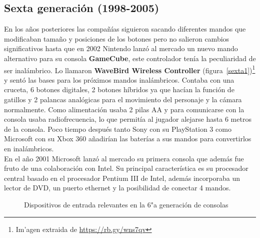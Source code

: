 
\subsection{Sexta generaci\'on (1998-2005)}

En los a\~nos posteriores las compa\~n\'ias siguieron sacando diferentes mandos que modificaban tama\~no y posiciones de los botones pero no salieron cambios significativos hasta que en 2002 Nintendo lanz\'o al mercado un nuevo mando alternativo para su consola \textbf{GameCube}, este controlador ten\'ia la peculiaridad de ser inal\'ambrico. Lo llamaron \textbf{WaveBird Wireless Controller} (figura~\ref{sexta1})\footnote{Im'agen extraida de \url{https://rb.gy/wns7qv}} y sent\'o las bases para los pr\'oximos mandos inal\'ambricos. Contaba con una cruceta, 6 botones digitales, 2 botones h\'ibridos ya que hac\'ian la funci\'on de gatillos y 2 palancas anal\'ogicas para el movimiento del personaje y la c\'amara normalmente. Como alimentaci\'on usaba 2 pilas AA y para comunicarse con la consola usaba radiofrecuencia, lo que permit\'ia al jugador alejarse hasta 6 metros de la consola. Poco tiempo despu\'es tanto Sony con su PlayStation 3 como Microsoft con su Xbox 360 a\~nadir\'ian las bater\'ias a sus mandos para convertirlos en inal\'ambricos. \\

En el a\~no 2001 Microsoft lanz\'o al mercado su primera consola que adem\'as fue fruto de una colaboraci\'on con Intel. Su principal caracter\'istica es su procesador central basado en el procesador Pentium III de Intel, adem\'as incorporaba un lector de DVD, un puerto ethernet y la posibilidad de conectar 4 mandos.

\begin{figure}[t]
     \hfill
{}
     \caption{Dispositivos de entrada relevantes en la 6"a  generaci\'on de consolas}
     \label{fig:sexta}
   \end{figure}

